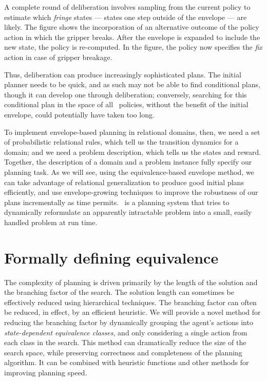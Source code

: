  A complete round of deliberation
involves sampling from the current policy to estimate which
\emph{fringe} states --- states one step outside of the envelope ---
are likely. The figure shows the incorporation of  an
alternative outcome of the policy action
in which the gripper breaks. After the envelope is expanded to include
the new state,
the policy is re-computed.  In the figure, the policy now specifies
the \emph{fix} action in case of gripper breakage.

Thus, deliberation can produce increasingly sophisticated plans. The 
initial planner needs to be quick, and as such may not be able to find conditional
plans, though it can develop one through deliberation; conversely, searching for this conditional plan in the space of all
\mdp\ policies, without the benefit of the initial envelope, could potentially
have taken too long.





To implement envelope-based
  planning in relational domains, then, we need a set of
  probabilistic relational rules, which tell us the transition
  dynamics for a domain; and we need a problem description, which tells us the
  states and reward.  Together, the description of a domain and a problem instance fully specify our planning task.
  As we will see, using the equivalence-based envelope method, we can take  advantage of
relational generalization to produce good initial plans efficiently,
and use envelope-growing techniques to improve the robustness of our
plans incrementally as time permits.  \rebp\ is a planning system that
tries to dynamically reformulate an apparently intractable problem
into a small, easily handled problem at run time.







\section{Formally defining equivalence}\label{chap-formal}



The complexity of planning is driven primarily by the length of the
solution and the branching factor of the search.  The solution length
can sometimes be effectively reduced using hierarchical techniques.
The branching factor can often be reduced, in effect, by an efficient
heuristic.  We will provide a novel method for reducing the
branching factor by dynamically grouping the agent's actions into
\emph{state-dependent equivalence classes}, and only considering a single
action from each class in the search.  This method can dramatically
reduce the size of the search space, while preserving correctness and
completeness of the planning algorithm.  It can be combined with
heuristic functions and other methods for improving planning speed.


